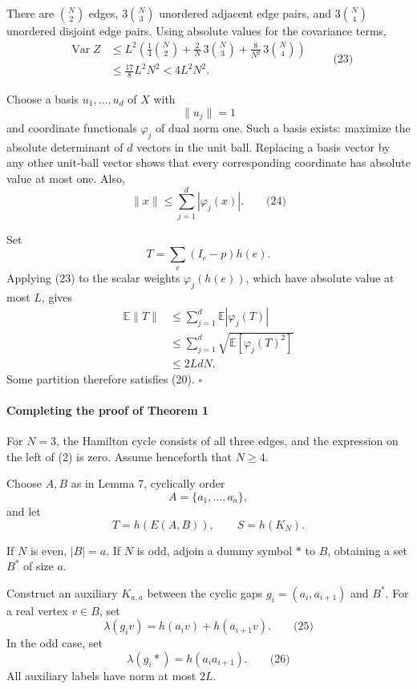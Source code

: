 \documentclass[
  11pt,
  a4paper,
]{article}
\begin{document}
There are \(\binom N2\) edges, \(3\binom N3\) unordered adjacent edge
pairs, and \(3\binom N4\) unordered disjoint edge pairs. Using absolute
values for the covariance terms, \begin{equation*}
\begin{aligned}
\operatorname{Var}Z
&\le L^2\left(
\frac14\binom N2
+\frac2N\,3\binom N3
+\frac8{N^2}\,3\binom N4
\right)\\
&\le \frac{17}{8}L^2N^2
<4L^2N^2.
\end{aligned}
\qquad\text{(23)}
\end{equation*}

Choose a basis \(u_1,\ldots,u_d\) of \(X\) with \[
\|u_j\|=1
\] and coordinate functionals \(\varphi_j\) of dual norm one. Such a
basis exists: maximize the absolute determinant of \(d\) vectors in the
unit ball. Replacing a basis vector by any other unit-ball vector shows
that every corresponding coordinate has absolute value at most one.
Also, \[
\|x\|\le\sum_{j=1}^d|\varphi_j(x)|.
\qquad\text{(24)}
\]

Set \[
T=\sum_e(I_e-p)h(e).
\] Applying (23) to the scalar weights \(\varphi_j(h(e))\), which have
absolute value at most \(L\), gives \begin{equation*}
\begin{aligned}
\mathbb E\|T\|
&\le \sum_{j=1}^d\mathbb E|\varphi_j(T)|\\
&\le \sum_{j=1}^d
\sqrt{\mathbb E[\varphi_j(T)^2]}\\
&\le 2LdN.
\end{aligned}
\end{equation*} Some partition therefore satisfies (20). \(\square\)

\paragraph{Completing the proof of Theorem
1}\label{completing-the-proof-of-theorem-1}

For \(N=3\), the Hamilton cycle consists of all three edges, and the
expression on the left of (2) is zero. Assume henceforth that \(N\ge4\).

Choose \(A,B\) as in Lemma 7, cyclically order \[
A=\{a_1,\ldots,a_a\},
\] and let \[
T=h(E(A,B)),\qquad S=h(K_N).
\]

If \(N\) is even, \(|B|=a\). If \(N\) is odd, adjoin a dummy symbol
\(\ast\) to \(B\), obtaining a set \(B^\ast\) of size \(a\).

Construct an auxiliary \(K_{a,a}\) between the cyclic gaps
\(g_i=(a_i,a_{i+1})\) and \(B^\ast\). For a real vertex \(v\in B\), set
\[
\lambda(g_i v)=h(a_i v)+h(a_{i+1}v).
\qquad\text{(25)}
\] In the odd case, set \[
\lambda(g_i\ast)=h(a_i a_{i+1}).
\qquad\text{(26)}
\] All auxiliary labels have norm at most \(2L\).
\end{document}
